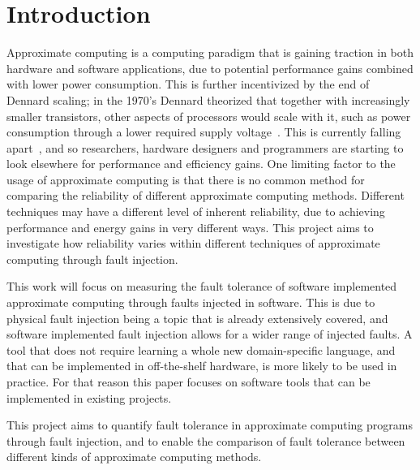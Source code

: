\section{Introduction}


Approximate computing is a computing paradigm that is gaining traction in both hardware and software applications, due to potential performance gains combined with lower power consumption. This is further incentivized by the end of Dennard scaling; in the 1970's Dennard  theorized that together with increasingly smaller transistors, other aspects of processors would scale with it, such as power consumption through a lower required supply voltage~\citep{bohr200730}. This is currently falling apart~\citep{esmaeilzadeh2011dark}, and so researchers, hardware designers and programmers are starting to look elsewhere for performance and efficiency gains. 
One limiting factor to the usage of approximate computing is that there is no common method for comparing the reliability of different approximate computing methods. Different techniques may have a different level of inherent reliability, due to achieving performance and energy gains in very different ways. This project aims to investigate how reliability varies within different techniques of approximate computing through fault injection.

This work will focus on measuring the fault tolerance of software implemented approximate computing through faults injected in software. This is due to physical fault injection being a topic that is already extensively covered, and software implemented fault injection allows for a wider range of injected faults. 
A tool that does not require learning a whole new domain-specific language, and that can be implemented in off-the-shelf hardware, is more likely to be used in practice. For that reason this paper focuses on software tools that can be implemented in existing projects.
 

This project aims to quantify fault tolerance in approximate computing programs through fault injection, and to enable the comparison of fault tolerance between different kinds of approximate computing methods.





